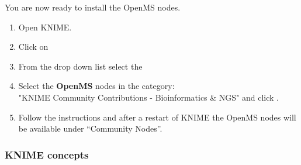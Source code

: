 You are now ready to install the OpenMS nodes.

\begin{enumerate}
\item Open KNIME.
\item Click on 
  

  \item From the  drop down list select the \\ 
\item Select the \textbf{OpenMS} nodes in the category: \\ "KNIME Community Contributions - Bioinformatics \& NGS" and click .
\item Follow the instructions and after a restart of KNIME the OpenMS nodes will be available under “Community Nodes”.
\end{enumerate}


\subsubsection{KNIME concepts}

